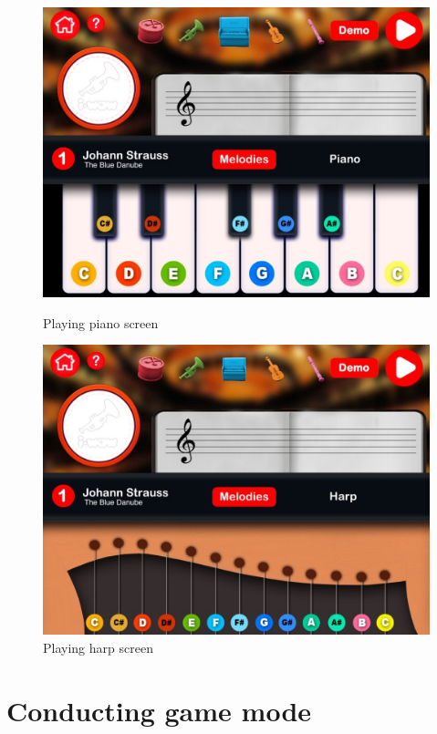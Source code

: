 \begin{figure}[ht!]
  \centering
  \includegraphics[width=350pt]{graphics/use-case/playing_piano_screen.jpg}
  \vspace{0.05cm}
  \caption{Playing piano screen}
  \vspace{0.6cm}

  \includegraphics[width=350pt]{graphics/use-case/playing_harp_screen.jpg}
  \vspace{0.05cm}
  \caption{Playing harp screen}
\end{figure}

\section{Conducting game mode}

